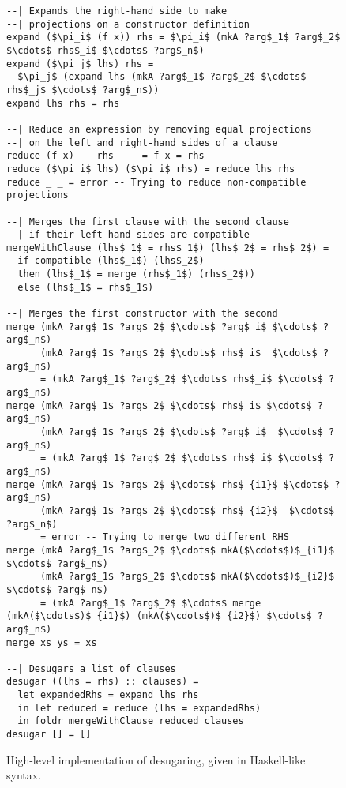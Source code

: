 \begin{figure}
\begin{lstlisting}[mathescape]
--| Expands the right-hand side to make 
--| projections on a constructor definition
expand ($\pi_i$ (f x)) rhs = $\pi_i$ (mkA ?arg$_1$ ?arg$_2$ $\cdots$ rhs$_i$ $\cdots$ ?arg$_n$)
expand ($\pi_j$ lhs) rhs = 
  $\pi_j$ (expand lhs (mkA ?arg$_1$ ?arg$_2$ $\cdots$ rhs$_j$ $\cdots$ ?arg$_n$))
expand lhs rhs = rhs

--| Reduce an expression by removing equal projections 
--| on the left and right-hand sides of a clause
reduce (f x)    rhs     = f x = rhs
reduce ($\pi_i$ lhs) ($\pi_i$ rhs) = reduce lhs rhs
reduce _ _ = error -- Trying to reduce non-compatible projections

--| Merges the first clause with the second clause
--| if their left-hand sides are compatible
mergeWithClause (lhs$_1$ = rhs$_1$) (lhs$_2$ = rhs$_2$) =
  if compatible (lhs$_1$) (lhs$_2$)
  then (lhs$_1$ = merge (rhs$_1$) (rhs$_2$))
  else (lhs$_1$ = rhs$_1$)

--| Merges the first constructor with the second
merge (mkA ?arg$_1$ ?arg$_2$ $\cdots$ ?arg$_i$ $\cdots$ ?arg$_n$)
      (mkA ?arg$_1$ ?arg$_2$ $\cdots$ rhs$_i$  $\cdots$ ?arg$_n$) 
      = (mkA ?arg$_1$ ?arg$_2$ $\cdots$ rhs$_i$ $\cdots$ ?arg$_n$)
merge (mkA ?arg$_1$ ?arg$_2$ $\cdots$ rhs$_i$ $\cdots$ ?arg$_n$)
      (mkA ?arg$_1$ ?arg$_2$ $\cdots$ ?arg$_i$  $\cdots$ ?arg$_n$) 
      = (mkA ?arg$_1$ ?arg$_2$ $\cdots$ rhs$_i$ $\cdots$ ?arg$_n$)
merge (mkA ?arg$_1$ ?arg$_2$ $\cdots$ rhs$_{i1}$ $\cdots$ ?arg$_n$)
      (mkA ?arg$_1$ ?arg$_2$ $\cdots$ rhs$_{i2}$  $\cdots$ ?arg$_n$) 
      = error -- Trying to merge two different RHS
merge (mkA ?arg$_1$ ?arg$_2$ $\cdots$ mkA($\cdots$)$_{i1}$ $\cdots$ ?arg$_n$)
      (mkA ?arg$_1$ ?arg$_2$ $\cdots$ mkA($\cdots$)$_{i2}$  $\cdots$ ?arg$_n$) 
      = (mkA ?arg$_1$ ?arg$_2$ $\cdots$ merge (mkA($\cdots$)$_{i1}$) (mkA($\cdots$)$_{i2}$) $\cdots$ ?arg$_n$)
merge xs ys = xs

--| Desugars a list of clauses
desugar ((lhs = rhs) :: clauses) =
  let expandedRhs = expand lhs rhs
  in let reduced = reduce (lhs = expandedRhs)
  in foldr mergeWithClause reduced clauses
desugar [] = []
\end{lstlisting}
\caption{High-level implementation of desugaring, given in Haskell-like syntax.}
\label{fig:desugar_step1}
\end{figure}


